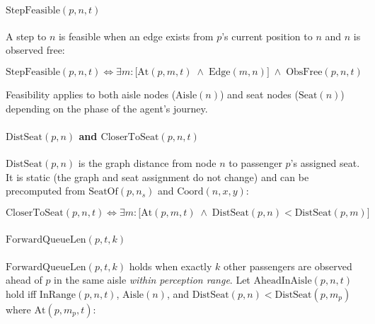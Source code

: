 \documentclass[11pt,a4paper]{article}
\begin{document}
\paragraph{$\text{StepFeasible}(p,n,t)$}

A step to $n$ is feasible when an edge exists from $p$'s current position to $n$
and $n$ is observed free:

\begin{equation}
  \text{StepFeasible}(p,n,t)
  \iff \exists m:\bigl[\text{At}(p,m,t) \;\wedge\; \text{Edge}(m,n)\bigr]
       \;\wedge\; \text{ObsFree}(p,n,t)
  \label{eq:stepfeasible}
\end{equation}

Feasibility applies to both aisle nodes ($\text{Aisle}(n)$) and seat nodes
($\text{Seat}(n)$) depending on the phase of the agent's journey.

\paragraph{$\text{DistSeat}(p,n)$ and $\text{CloserToSeat}(p,n,t)$}

$\text{DistSeat}(p,n)$ is the graph distance from node $n$ to passenger $p$'s
assigned seat. It is static (the graph and seat assignment do not change) and can be
precomputed from $\text{SeatOf}(p,n_s)$ and $\text{Coord}(n,x,y)$:

\begin{equation}
  \text{CloserToSeat}(p,n,t)
  \iff \exists m:\bigl[\text{At}(p,m,t) \;\wedge\; \text{DistSeat}(p,n) < \text{DistSeat}(p,m)\bigr]
  \label{eq:closertoseat}
\end{equation}

\paragraph{$\text{ForwardQueueLen}(p,t,k)$}

$\text{ForwardQueueLen}(p,t,k)$ holds when exactly $k$ other passengers are observed
ahead of $p$ in the same aisle \emph{within perception range}.
Let $\text{AheadInAisle}(p,n,t)$ hold iff $\text{InRange}(p,n,t)$, $\text{Aisle}(n)$,
and $\text{DistSeat}(p,n) < \text{DistSeat}(p,m_p)$ where $\text{At}(p,m_p,t)$:
\end{document}
